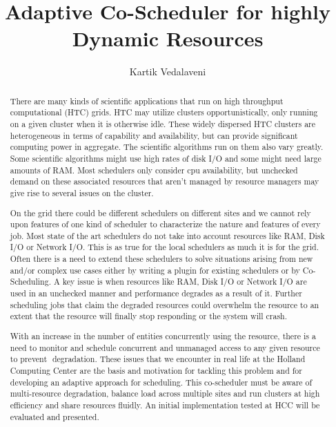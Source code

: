 \documentclass[ms,electronic,double]{nuthesis}
\begin{document}
\frontmatter
\title{Adaptive Co-Scheduler for highly Dynamic Resources}
\author{Kartik Vedalaveni}
\maketitle

\begin{abstract}
 There are many kinds of scientific applications that run on high throughput computational (HTC) 
grids. HTC may utilize clusters opportunistically, only running on a given cluster 
when it is otherwise idle. These widely dispersed HTC clusters are heterogeneous in terms of 
capability and availability, but can provide significant computing power in aggregate. The scientific 
algorithms run on them also vary greatly. Some scientific algorithms might use high rates of disk I/O 
and some might need large amounts of RAM. Most schedulers only consider cpu availability, but 
unchecked demand on these associated resources that aren't managed by resource managers 
may give rise to several issues on the cluster.

On the grid there could be different schedulers on different sites and we cannot rely upon features 
of one kind of scheduler to characterize the nature and features of every job. Most state of the art 
schedulers do not take into account resources like RAM, Disk I/O or Network I/O. This is as true for the
 local schedulers as much it is for the grid. Often there is a need to extend these schedulers to solve 
 situations arising from new and/or complex use cases either by writing a plugin for existing schedulers or by Co­Scheduling. 
 A key issue is when resources like RAM, Disk I/O or Network I/O are used in an unchecked manner and 
 performance degrades as a result of it. Further scheduling jobs that claim the degraded resources could 
 overwhelm the resource to an extent that the resource will finally stop responding or the system will crash. 

With an increase in the number of entities concurrently using the resource, there is a need to monitor and schedule concurrent and unmanaged access to any given resource to prevent  degradation. These issues that we encounter in real life at the Holland Computing Center 
are the basis and motivation for tackling this problem and for developing an adaptive approach for scheduling. 
This co-scheduler must be aware of multi­-resource degradation, balance load across multiple sites and 
run clusters at high efficiency and share resources fluidly. An initial implementation tested at HCC will 
be evaluated and presented. 

  
\end{abstract}
\end{document}
